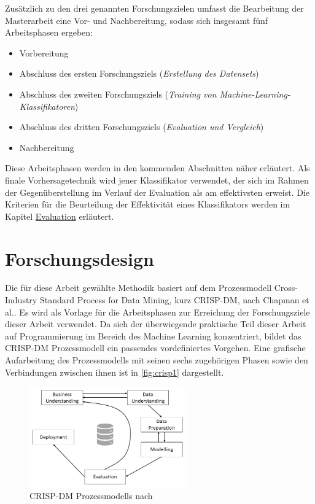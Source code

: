 \label{phases_definition}

Zusätzlich zu den drei genannten Forschungszielen umfasst die Bearbeitung der Masterarbeit eine Vor- und Nachbereitung, sodass sich insgesamt fünf Arbeitsphasen ergeben:

\begin{itemize}
\setlength{\itemsep}{-2pt}
\item Vorbereitung
\item Abschluss des ersten Forschungsziels (\textit{Erstellung des Datensets})
\item Abschluss des zweiten Forschungsziels (\textit{Training von Machine-Learning-Klassifikatoren})
\item Abschluss des dritten Forschungsziels (\textit{Evaluation und Vergleich})
\item Nachbereitung
\end{itemize}

Diese Arbeitsphasen werden in den kommenden Abschnitten näher erläutert. Als finale Vorhersagetechnik wird jener Klassifikator verwendet, der sich im Rahmen der Gegenüberstellung im Verlauf der Evaluation als am \glqq effektivsten\grqq{} erweist. Die Kriterien für die Beurteilung der Effektivität eines Klassifikators werden im Kapitel \glqq \hyperref[evaluation]{Evaluation}\grqq{} erläutert.

\section{Forschungsdesign}

Die für diese Arbeit gewählte Methodik basiert auf dem Prozessmodell \glqq Cross-Industry Standard Process for Data Mining\grqq, kurz CRISP-DM, nach Chapman et al.\cite{Chapman2000}. Es wird als Vorlage für die Arbeitsphasen zur Erreichung der Forschungsziele dieser Arbeit verwendet. Da sich der überwiegende praktische Teil dieser Arbeit auf Programmierung im Bereich des Machine Learning konzentriert, bildet das CRISP-DM Prozessmodell ein passendes vordefiniertes Vorgehen. Eine grafische Aufarbeitung des Prozessmodells mit seinen sechs zugehörigen Phasen sowie den Verbindungen zwischen ihnen ist in \autoref{fig:crisp1} dargestellt. 

\begin{figure}[H]
    \centering
    \includegraphics[width=0.6\textwidth]{images/CRISP-DM1}
    \caption{CRISP-DM Prozessmodells nach \cite{Chapman2000}}\label{fig:crisp1}
\end{figure}

